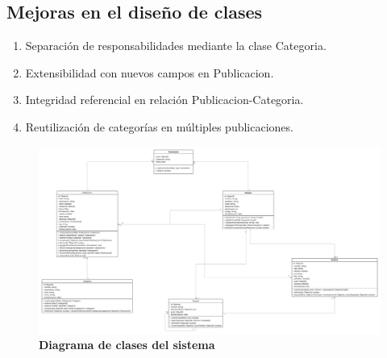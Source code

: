 \subsection*{Mejoras en el diseño de clases}
\begin{enumerate}
  \item Separación de responsabilidades mediante la clase {Categoria}.
  \item Extensibilidad con nuevos campos en {Publicacion}.
  \item Integridad referencial en relación {Publicacion-Categoria}.
  \item Reutilización de categorías en múltiples publicaciones.
\end{enumerate}

\begin{figure}[H]
  \centering
    \includegraphics[width=15cm]{project/images/DC.png}
  \caption{\textbf{Diagrama de clases del sistema}}
  \label{DiagramaClases}
\end{figure}



